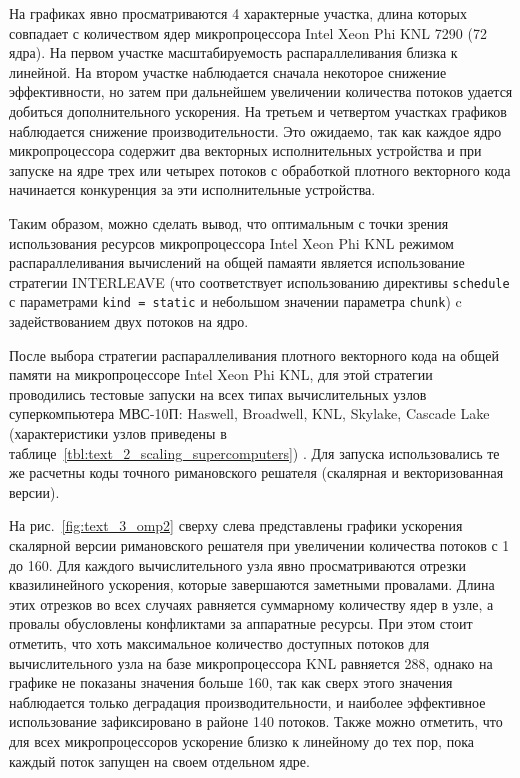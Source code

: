 На графиках явно просматриваются 4 характерные участка, длина которых совпадает с количеством ядер микропроцессора Intel Xeon Phi KNL 7290 (72 ядра).
На первом участке масштабируемость распараллеливания близка к линейной.
На втором участке наблюдается сначала некоторое снижение эффективности, но затем при дальнейшем увеличении количества потоков удается добиться дополнительного ускорения.
На третьем и четвертом участках графиков наблюдается снижение производительности.
Это ожидаемо, так как каждое ядро микропроцессора содержит два векторных исполнительных устройства и при запуске на ядре трех или четырех потоков с обработкой плотного векторного кода начинается конкуренция за эти исполнительные устройства.

Таким образом, можно сделать вывод, что оптимальным с точки зрения использования ресурсов микропроцессора Intel Xeon Phi KNL режимом распараллеливания вычислений на общей памаяти является использование стратегии INTERLEAVE (что соответствует использованию директивы \texttt{schedule} с параметрами \texttt{kind = static} и небольшом значении параметра \texttt{chunk}) c задействованием двух потоков на ядро.


После выбора стратегии распараллеливания плотного векторного кода на общей памяти на микропроцессоре Intel Xeon Phi KNL\label{abbr:knl4}, для этой стратегии проводились тестовые запуски на всех типах вычислительных узлов суперкомпьютера МВС-10П: Haswell, Broadwell, KNL, Skylake, Cascade Lake (характеристики узлов приведены в таблице~\ref{tbl:text_2_scaling_supercomputers}) \cite{Vorobyov2020Scaling}.
Для запуска использовались те же расчетны коды точного римановского решателя (скалярная и векторизованная версии).

На рис.~\ref{fig:text_3_omp2} сверху слева представлены графики ускорения скалярной версии римановского решателя при увеличении количества потоков с 1 до 160.
Для каждого вычислительного узла явно просматриваются отрезки квазилинейного ускорения, которые завершаются заметными провалами.
Длина этих отрезков во всех случаях равняется суммарному количеству ядер в узле, а провалы обусловлены конфликтами за аппаратные ресурсы.
При этом стоит отметить, что хоть максимальное количество доступных потоков для вычислительного узла на базе микропроцессора KNL равняется 288, однако на графике не показаны значения больше 160, так как сверх этого значения наблюдается только деградация производительности, и наиболее эффективное использование зафиксировано в районе 140 потоков.
Также можно отметить, что для всех микропроцессоров ускорение близко к линейному до тех пор, пока каждый поток запущен на своем отдельном ядре.

